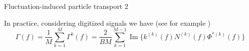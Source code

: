 \documentclass[t,10pt]{beamer}
\renewcommand\Im{\operatorname{Im}}
\begin{document}
\begin{frame}{Fluctuation-induced particle transport 2}
\begin{itemize}
{\footnotesize
\item In practice, considering digitized signals we have
  \footnotesize{(see for example \parencite{Antoni:2000bn})}
\begin{equation*}
\Gamma(f)=\frac{1}{M}\sum_{k=1}^{M}\Gamma^{k}(f) = \frac{2}{BM}\sum_{k=1}^{M-1}\Im\{k^{(k)}(f)N^{(k)}(f)\Phi^{*(k)}(f)\}
\end{equation*}
}


\end{itemize}
\end{frame}
\end{document}
